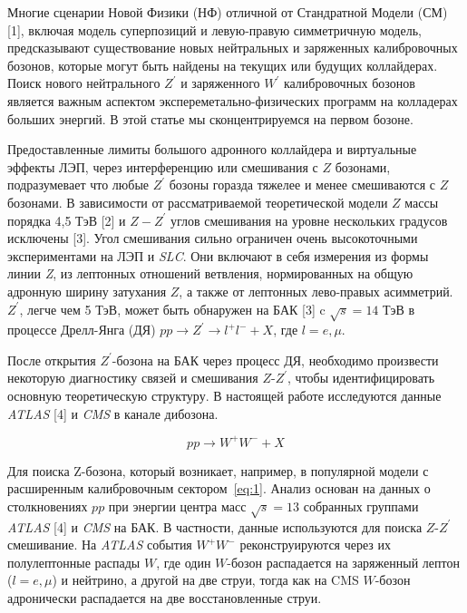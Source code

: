 Многие сценарии Новой Физики (НФ) отличной от Стандратной Модели (СМ)[1], включая модель суперпозиций и левую-правую симметричную модель, предсказывают существование новых нейтральных и заряженных калибровочных бозонов, которые могут быть найдены на текущих или будущих коллайдерах. Поиск нового нейтрального $Z^\prime$ и заряженного $W^\prime$ калибровочных бозонов является важным аспектом экспереметально-физических программ на колладерах больших энергий. В этой статье мы сконцентрируемся на первом бозоне.

Предоставленные лимиты большого адронного коллайдера и виртуальные эффекты ЛЭП, через интерференцию или смешивания с $Z$ бозонами, подразумевает что любые $Z^\prime$ бозоны горазда тяжелее и менее смешиваются с $Z$ бозонами. В зависимости от рассматриваемой теоретической модели $Z$ массы порядка 4,5 ТэВ [2] и $Z-Z^\prime$ углов смешивания на уровне нескольких градусов исключены [3]. Угол смешивания сильно ограничен очень высокоточными экспериментами на ЛЭП и \textit{SLC}. Они включают в себя измерения из формы линии \textit{Z}, из лептонных отношений ветвления, нормированных на общую адронную ширину затухания $Z$, а также от лептонных лево-правых асимметрий. $Z^\prime$, легче чем 5 ТэВ, может быть обнаружен на БАК [3] c $\sqrt{s} = 14 $ ТэВ в процессе Дрелл-Янга (ДЯ) $pp \rightarrow Z^\prime \rightarrow l^+l^- + X$, где $l=e,\mu$.

После открытия $Z^\prime$-бозона на БАК через процесс ДЯ, необходимо произвести некоторую диагностику связей и смешивания $Z$-$Z^\prime$, чтобы идентифицировать основную теоретическую структуру. В настоящей работе исследуются данные \textit{ATLAS} [4] и \textit{CMS} в канале дибозона.

\begin{equation} \label{eq:1}
pp \rightarrow W^+W^- + X
\end{equation}

Для поиска Z-бозона, который возникает, например, в популярной модели с расширенным калибровочным сектором~\ref{eq:1}. Анализ основан на данных о столкновениях $pp$ при энергии центра масс $\sqrt{s} = 13 $ собранных группами \textit{ATLAS} [4] и \textit{CMS} на БАК. В частности, данные используются для поиска $Z$-$Z^\prime$ смешивание. На \textit{ATLAS} события $W^+W^-$ реконструируются через их полулептонные распады $W$, где один $W$-бозон распадается на заряженный лептон ($l=e,\mu$) и нейтрино, а другой на две струи, тогда как на CMS $W$-бозон адронически распадается на две восстановленные струи. 

